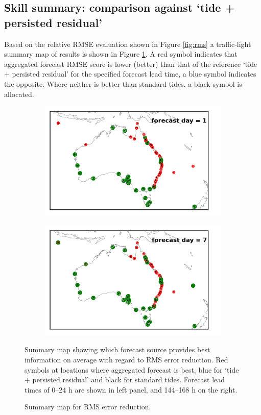\subsection{Skill summary: comparison against `tide + persisted residual'}
Based on the relative RMSE evaluation shown in Figure \ref{fig:rms} a traffic-light summary map of results is shown in Figure \ref{fig:map_rms}.
A red symbol indicates that aggregated forecast RMSE score is lower (better) than that of the reference `tide + persisted residual' for the specified forecast lead time, a blue symbol indicates the opposite.  Where neither is better than standard tides, a black symbol is allocated.   
\begin{figure}[H]
    \centering
    \begin{subfigure}[b]{0.45\textwidth}
        \includegraphics[width=\textwidth]{figures/maps/plot_map_rms_score_day_1.png}
    \end{subfigure}
    \begin{subfigure}[b]{0.45\textwidth}
        \includegraphics[width=\textwidth]{figures/maps/plot_map_rms_score_day_7.png}
    \end{subfigure}
    \caption{Summary map for RMS error reduction.}{Summary map showing which forecast source provides best information on average with regard to RMS error reduction. Red symbols at locations where aggregated forecast is best, blue for `tide + persisted residual' and black for standard tides.  Forecast lead times of 0--24 h are shown in left panel, and 144--168 h on the right.}
    \label{fig:map_rms}
\end{figure}   



